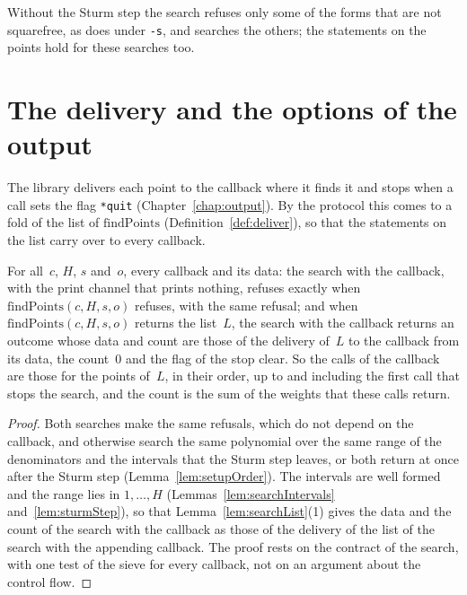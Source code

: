 Without the Sturm step the search refuses only some of the forms that are not squarefree, as
\ratpoints{} does under \verb|-s|, and searches the others; the statements on the points hold for these
searches too.

\section{The delivery and the options of the output}\label{sec:theoremsDelivery}

The library delivers each point to the callback where it finds it and stops when a call sets the
flag \verb|*quit| (Chapter~\ref{chap:output}). By the protocol this comes to a fold of the list of
$\mathrm{findPoints}$ (Definition~\ref{def:deliver}), so that the statements on the list carry over
to every callback.

\begin{theorem}\label{thm:protocol}
  \leanok
  For all~$c$, $H$, $s$ and~$o$, every callback and its data: the search with the callback, with the
  print channel that prints nothing, refuses exactly when $\mathrm{findPoints}(c, H, s, o)$ refuses,
  with the same refusal; and when $\mathrm{findPoints}(c, H, s, o)$ returns the list~$L$, the search
  with the callback returns an outcome whose data and count are those of the delivery of~$L$ to the
  callback from its data, the count~$0$ and the flag of the stop clear. So the calls of the callback
  are those for the points of~$L$, in their order, up to and including the first call that stops the
  search, and the count is the sum of the weights that these calls return.
\end{theorem}

\begin{proof}
  \leanok
  Both searches make the same refusals, which do not depend on the callback, and otherwise search
  the same polynomial over the same range of the denominators and the intervals that the Sturm step
  leaves, or both return at once after the Sturm step (Lemma~\ref{lem:setupOrder}). The intervals
  are well formed and the range lies in $1, \dots, H$ (Lemmas~\ref{lem:searchIntervals}
  and~\ref{lem:sturmStep}), so that Lemma~\ref{lem:searchList}(1) gives the data and the count of
  the search with the callback as those of the delivery of the list of the search with the appending
  callback. The proof rests on the contract of the search, with one test of the sieve for every
  callback, not on an argument about the control flow.
\end{proof}


